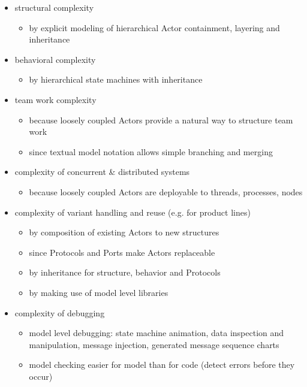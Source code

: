 \begin{itemize}
 \item structural complexity
	\begin{itemize}
\item by explicit modeling of hierarchical Actor containment, layering and inheritance \end{itemize}
\item behavioral complexity
\begin{itemize}
\item by hierarchical state machines with inheritance \end{itemize}
\item team work complexity
	\begin{itemize}
\item because loosely coupled Actors provide a natural way to structure team work
\item since textual model notation allows simple branching and merging \end{itemize}
\item complexity of concurrent \& distributed systems
	\begin{itemize}
\item because loosely coupled Actors are deployable to threads, processes, nodes \end{itemize}
\item complexity of variant handling and reuse (e.g. for product lines)
	\begin{itemize}
\item by composition of existing Actors to new structures
\item since Protocols and Ports make Actors replaceable
\item by inheritance for structure, behavior and Protocols
\item by making use of model level libraries  \end{itemize}
\item complexity of debugging
	 \begin{itemize}
\item model level debugging: state machine animation, data inspection and manipulation, message injection, 
generated message sequence charts
\item model checking easier for model than for code (detect errors before they occur)  \end{itemize}
\end{itemize}
